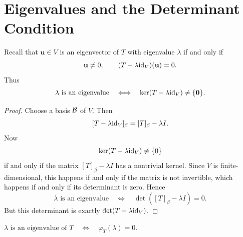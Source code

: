 \documentclass[11pt,openany]{article}
\renewcommand{\vec}[1]{\mathbf{#1}}
\begin{document}
\section*{Eigenvalues and the Determinant Condition}
Recall that $\vec{u}\in V$ is an eigenvector of $T$ with eigenvalue $\lambda$ if and only if \[
\vec{u}\neq 0,\qquad
(T-\lambda\id_V)(\vec{u})=0.
\] Thus
\[
\lambda\text{ is an eigenvalue}
\quad\Longleftrightarrow\quad
\ker(T-\lambda\id_V)\neq\{\vec{0}\}.
\]

\begin{proof}
Choose a basis $\mathcal{B}$ of $V$.  Then
\[
[T-\lambda\textnormal{id}_V]_{\beta}=[T]_{\beta}-\lambda I.
\]
Now
\[
\ker(T-\lambda\textnormal{id}_V)\neq\{0\}
\]
if and only if the matrix $[T]_{\beta}-\lambda I$ has a nontrivial kernel.  Since $V$ is finite-dimensional, this happens if and only if the matrix is not invertible, which happens if and only if its determinant is zero.  Hence
\[
\lambda\text{ is an eigenvalue}
\quad\Longleftrightarrow\quad
\det([T]_{\beta}-\lambda I)=0.
\]
But this determinant is exactly $\det(T-\lambda\textnormal{id}_V)$.
\end{proof}

\begin{remark}
$\lambda\text{ is an eigenvalue of }T
\quad\Longleftrightarrow\quad
\varphi_T(\lambda)=0.$
\end{remark}
\end{document}
